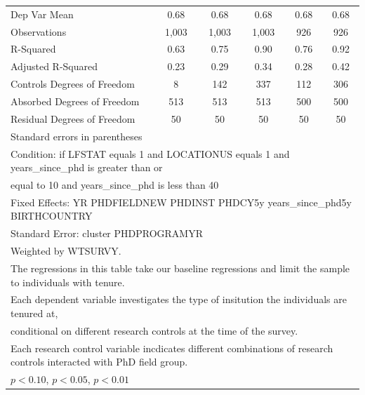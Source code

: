 \begin{table}[htbp]
\begin{tabular}{l*{5}{c}}
Dep Var Mean&        0.68         &        0.68         &        0.68         &        0.68         &        0.68         \\
Observations&       1,003         &       1,003         &       1,003         &         926         &         926         \\
R-Squared&        0.63         &        0.75         &        0.90         &        0.76         &        0.92         \\
Adjusted R-Squared&        0.23         &        0.29         &        0.34         &        0.28         &        0.42         \\
Controls Degrees of Freedom&           8         &         142         &         337         &         112         &         306         \\
Absorbed Degrees of Freedom&         513         &         513         &         513         &         500         &         500         \\
Residual Degrees of Freedom&          50         &          50         &          50         &          50         &          50         \\
\hline\hline
\multicolumn{6}{l}{\footnotesize Standard errors in parentheses}\\
\multicolumn{6}{l}{\footnotesize Condition: if LFSTAT equals 1 and LOCATIONUS equals 1 and years\_since\_phd is greater than or}\\
\multicolumn{6}{l}{\footnotesize equal to 10 and years\_since\_phd is less than 40}\\
\multicolumn{6}{l}{\footnotesize Fixed Effects: YR PHDFIELDNEW PHDINST PHDCY5y years\_since\_phd5y BIRTHCOUNTRY}\\
\multicolumn{6}{l}{\footnotesize Standard Error: cluster PHDPROGRAMYR}\\
\multicolumn{6}{l}{\footnotesize Weighted by WTSURVY.}\\
\multicolumn{6}{l}{\footnotesize The regressions in this table take our baseline regressions and limit the sample to individuals with tenure.}\\
\multicolumn{6}{l}{\footnotesize Each dependent variable investigates the type of insitution the individuals are tenured at,}\\
\multicolumn{6}{l}{\footnotesize conditional on different research controls at the time of the survey.}\\
\multicolumn{6}{l}{\footnotesize Each research control variable incdicates different combinations of research controls interacted with PhD field group.}\\
\multicolumn{6}{l}{\footnotesize \sym{*} \(p<0.10\), \sym{**} \(p<0.05\), \sym{***} \(p<0.01\)}\\
\end{tabular}
\end{table}
